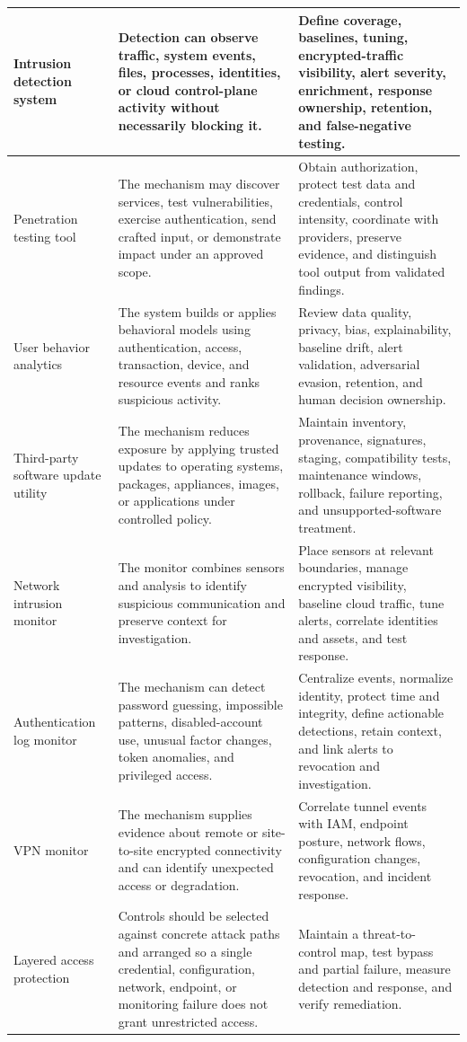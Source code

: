 \documentclass[11pt]{article}
\begin{document}
\begin{longtable}{@{}>{\RaggedRight\arraybackslash}p{}>{\RaggedRight\arraybackslash}p{}>{\RaggedRight\arraybackslash}p{}@{}}
Intrusion detection system & Detection can observe traffic, system events, files, processes, identities, or cloud control-plane activity without necessarily blocking it. & Define coverage, baselines, tuning, encrypted-traffic visibility, alert severity, enrichment, response ownership, retention, and false-negative testing. \\\midrule
Penetration testing tool & The mechanism may discover services, test vulnerabilities, exercise authentication, send crafted input, or demonstrate impact under an approved scope. & Obtain authorization, protect test data and credentials, control intensity, coordinate with providers, preserve evidence, and distinguish tool output from validated findings. \\\midrule
User behavior analytics & The system builds or applies behavioral models using authentication, access, transaction, device, and resource events and ranks suspicious activity. & Review data quality, privacy, bias, explainability, baseline drift, alert validation, adversarial evasion, retention, and human decision ownership. \\\midrule
Third-party software update utility & The mechanism reduces exposure by applying trusted updates to operating systems, packages, appliances, images, or applications under controlled policy. & Maintain inventory, provenance, signatures, staging, compatibility tests, maintenance windows, rollback, failure reporting, and unsupported-software treatment. \\\midrule
Network intrusion monitor & The monitor combines sensors and analysis to identify suspicious communication and preserve context for investigation. & Place sensors at relevant boundaries, manage encrypted visibility, baseline cloud traffic, tune alerts, correlate identities and assets, and test response. \\\midrule
Authentication log monitor & The mechanism can detect password guessing, impossible patterns, disabled-account use, unusual factor changes, token anomalies, and privileged access. & Centralize events, normalize identity, protect time and integrity, define actionable detections, retain context, and link alerts to revocation and investigation. \\\midrule
VPN monitor & The mechanism supplies evidence about remote or site-to-site encrypted connectivity and can identify unexpected access or degradation. & Correlate tunnel events with IAM, endpoint posture, network flows, configuration changes, revocation, and incident response. \\\midrule
Layered access protection & Controls should be selected against concrete attack paths and arranged so a single credential, configuration, network, endpoint, or monitoring failure does not grant unrestricted access. & Maintain a threat-to-control map, test bypass and partial failure, measure detection and response, and verify remediation. \\\midrule
\bottomrule
\end{longtable}
\endgroup
\end{document}
